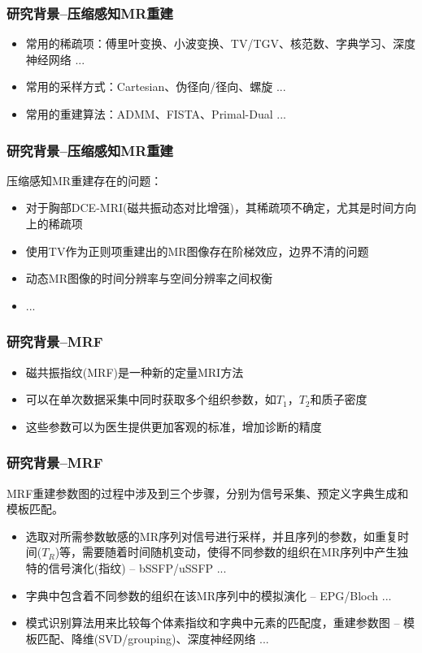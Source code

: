 \documentclass{beamer}
\begin{document}
\begin{frame}
	\frametitle{研究背景--压缩感知MR重建}
	\begin{itemize}
		\item 常用的稀疏项：傅里叶变换、小波变换、TV/TGV、核范数、字典学习、深度神经网络 ...
		\item 常用的采样方式：Cartesian、伪径向/径向、螺旋 ...
		\item 常用的重建算法：ADMM、FISTA、Primal-Dual ...
	\end{itemize}
\end{frame}


\begin{frame}
	\frametitle{研究背景--压缩感知MR重建}
	压缩感知MR重建存在的问题：
	\begin{itemize}
		\item 对于胸部DCE-MRI(磁共振动态对比增强)，其稀疏项不确定，尤其是时间方向上的稀疏项
		\item 使用TV作为正则项重建出的MR图像存在阶梯效应，边界不清的问题
		\item 动态MR图像的时间分辨率与空间分辨率之间权衡
		\item ...
	\end{itemize}
\end{frame}

\begin{frame}
	\frametitle{研究背景--MRF}
	\begin{itemize}
		\item 磁共振指纹(MRF)是一种新的定量MRI方法
		\item 可以在单次数据采集中同时获取多个组织参数，如$T_1$，$T_2$和质子密度
		\item 这些参数可以为医生提供更加客观的标准，增加诊断的精度
	\end{itemize}
\end{frame}

\begin{frame}
\frametitle{研究背景--MRF}
	MRF重建参数图的过程中涉及到三个步骤，分别为信号采集、预定义字典生成和模板匹配。
	\begin{itemize}
		\item 选取对所需参数敏感的MR序列对信号进行采样，并且序列的参数，如重复时间($T_R$)等，需要随着时间随机变动，使得不同参数的组织在MR序列中产生独特的信号演化(指纹) -- bSSFP/uSSFP ...
		\item 字典中包含着不同参数的组织在该MR序列中的模拟演化 -- EPG/Bloch ...
		\item 模式识别算法用来比较每个体素指纹和字典中元素的匹配度，重建参数图 -- 模板匹配、降维(SVD/grouping)、深度神经网络 ...
	\end{itemize}
\end{frame}
\end{document}

